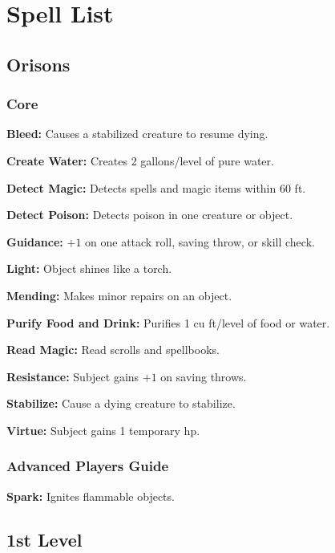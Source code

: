 \documentclass{spelllist}
\begin{document}
  \section*{Spell List}
  
  \subsection*{Orisons}
  \subsubsection*{Core}
  \begin{flushleft}
    \textbf{Bleed:} Causes a stabilized creature to resume dying.
    
    \textbf{Create Water:} Creates 2 gallons/level of pure water.
    
    \textbf{Detect Magic:} Detects spells and magic items within 60 ft.
    
    \textbf{Detect Poison:} Detects poison in one creature or object.
    
    \textbf{Guidance:} $+1$ on one attack roll, saving throw, or skill check.
    
    \textbf{Light:} Object shines like a torch.
    
    \textbf{Mending:} Makes minor repairs on an object.
    
    \textbf{Purify Food and Drink:} Purifies 1 cu ft/level of food or water.
    
    \textbf{Read Magic:} Read scrolls and spellbooks.
    
    \textbf{Resistance:} Subject gains $+1$ on saving throws.
    
    \textbf{Stabilize:} Cause a dying creature to stabilize.
    
    \textbf{Virtue:} Subject gains 1 temporary hp.
  \end{flushleft}
  
  \subsubsection*{Advanced Players Guide}
  \begin{flushleft}
    \textbf{Spark:} Ignites flammable objects.
  \end{flushleft}
  
  \subsection*{1st Level}
\end{document}
